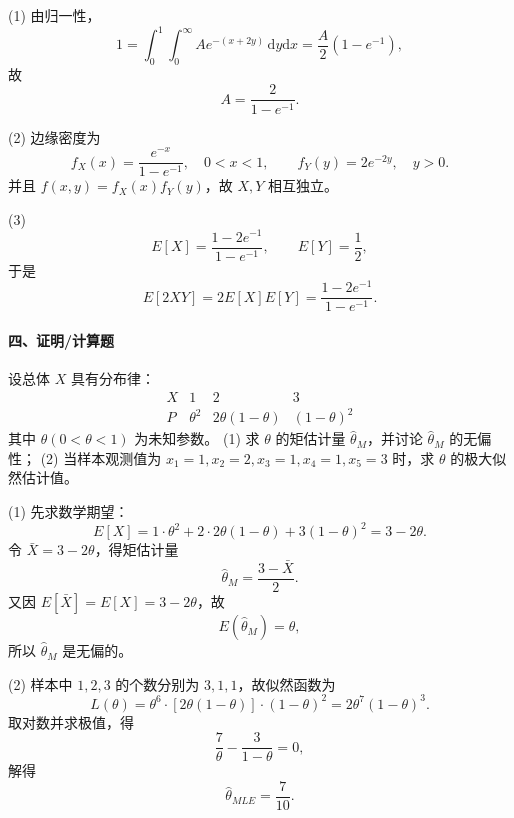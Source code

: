 \documentclass[lang=cn,11pt]{elegantbook}
\begin{document}
\begin{solution}
\par
(1) 由归一性，
\[
1=\int_0^1\int_0^\infty Ae^{-(x+2y)}\,\mathrm{d}y\mathrm{d}x
=\frac A2(1-e^{-1}),
\]
故
\[
A=\frac{2}{1-e^{-1}}.
\]

(2) 边缘密度为
\[
f_X(x)=\frac{e^{-x}}{1-e^{-1}},\quad 0<x<1,
\qquad
f_Y(y)=2e^{-2y},\quad y>0.
\]
并且 \(f(x,y)=f_X(x)f_Y(y)\)，故 \(X,Y\) 相互独立。

(3)
\[
E[X]=\frac{1-2e^{-1}}{1-e^{-1}},\qquad E[Y]=\frac12,
\]
于是
\[
E[2XY]=2E[X]E[Y]=\frac{1-2e^{-1}}{1-e^{-1}}.
\]
\end{solution}

\paragraph*{四、证明/计算题}
\begin{exercise}
\par
设总体 \(X\) 具有分布律：
\[
\begin{array}{c|ccc}
X & 1 & 2 & 3\\ \hline
P & \theta^2 & 2\theta(1-\theta) & (1-\theta)^2
\end{array}
\]
其中 \(\theta(0<\theta<1)\) 为未知参数。
(1) 求 \(\theta\) 的矩估计量 \(\hat{\theta}_M\)，并讨论 \(\hat{\theta}_M\) 的无偏性；
(2) 当样本观测值为 \(x_1=1,x_2=2,x_3=1,x_4=1,x_5=3\) 时，求 \(\theta\) 的极大似然估计值。
\end{exercise}

\begin{solution}
\par
(1) 先求数学期望：
\[
E[X]=1\cdot\theta^2+2\cdot2\theta(1-\theta)+3(1-\theta)^2=3-2\theta.
\]
令 \(\bar X=3-2\theta\)，得矩估计量
\[
\hat\theta_M=\frac{3-\bar X}{2}.
\]
又因 \(E[\bar X]=E[X]=3-2\theta\)，故
\[
E(\hat\theta_M)=\theta,
\]
所以 \(\hat\theta_M\) 是无偏的。

(2) 样本中 \(1,2,3\) 的个数分别为 \(3,1,1\)，故似然函数为
\[
L(\theta)=\theta^{6}\cdot[2\theta(1-\theta)]\cdot(1-\theta)^2
=2\theta^7(1-\theta)^3.
\]
取对数并求极值，得
\[
\frac{7}{\theta}-\frac{3}{1-\theta}=0,
\]
解得
\[
\hat\theta_{MLE}=\frac{7}{10}.
\]
\end{solution}
\end{document}
